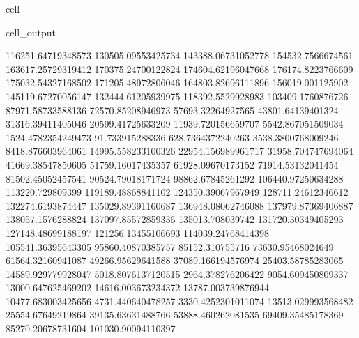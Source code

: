 \documentclass[letterpaper,10pt,english]{jupyterBook}
\begin{document}
\begin{sphinxuseclass}{cell}
\begin{sphinxVerbatimOutput}
\begin{sphinxuseclass}{cell_output}
\begin{sphinxVerbatim}[commandchars=\\\{\}]
116251.64719348573  130505.09553425734  143388.06731052778  154532.7566674561  163617.25729319412  170375.24700122824  174604.62196047668  176174.8223766609  175032.54327168502  171205.48972806046  164803.82696111896  156019.001125902  145119.67270056147  132444.61205939975  118392.5529928983  103409.1760876726  87971.58733588136  72570.85208946973  57693.32264927565  43801.64139401324  31316.39411405046  20599.41725633209  11939.720156659707  5542.867051509034  1524.4782354249473  \PYGZhy{}91.733915288336  628.7364372240263  3538.3800768009246  8418.876603964061  14995.558233100326  22954.156989961717  31958.704747694064  41669.38547850605  51759.16017435357  61928.09670173152  71914.53132041454  81502.45052457541  90524.79018171724  98862.67845261292  106440.97250634288  113220.729809399  119189.48868841102  124350.39067967949  128711.24612346612  132274.6193874447  135029.89391160687  136948.08062746088  137979.87369406887  138057.1576288824  137097.85572859336  135013.708039742  131720.30349405293  127148.48699188197  121256.13455106693  114039.24768414398  105541.36395643305  95860.40870385757  85152.310755716  73630.95468024649  61564.32160941087  49266.95629641588  37089.166194576974  25403.58785283065  14589.929779928047  5018.8076137120515  \PYGZhy{}2964.378276206422  \PYGZhy{}9054.609450809337  \PYGZhy{}13000.647625469202  \PYGZhy{}14616.003673234372  \PYGZhy{}13787.003739876944  \PYGZhy{}10477.683003425656  \PYGZhy{}4731.440640478257  3330.4252301011074  13513.029993568482  25554.67649219864  39135.63631488766  53888.460262081535  69409.35485178369  85270.20678731604  101030.90094110397  

\end{sphinxVerbatim}
\end{sphinxuseclass}
\end{sphinxVerbatimOutput}
\end{sphinxuseclass}
\end{document}
